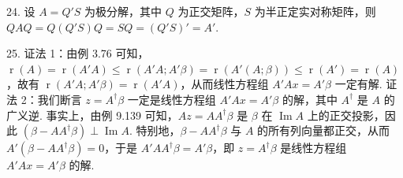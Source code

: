 \documentclass[UTF8, 12pt, fontset=fandol, oneside]{ctexart}
\begin{document}
24. 设 $A=Q'S$ 为极分解，其中 $Q$ 为正交矩阵，$S$ 为半正定实对称矩阵，则 $QAQ=Q(Q'S)Q=SQ=(Q'S)'=A'$.

25. 证法 1：由例 3.76 可知，$\operatorname{r}(A)=\operatorname{r}(A'A)\le \operatorname{r}(A'A;A'\beta)=\operatorname{r}(A'(A;\beta))\le \operatorname{r}(A')=\operatorname{r}(A)$，故有 $\operatorname{r}(A'A;A'\beta)=\operatorname{r}(A'A)$，从而线性方程组 $A'Ax=A'\beta$ 一定有解. 证法 2：我们断言 $z=A^\dagger\beta$ 一定是线性方程组 $A'Ax=A'\beta$ 的解，其中 $A^\dagger$ 是 $A$ 的广义逆. 事实上，由例 9.139 可知，$Az=AA^\dagger\beta$ 是 $\beta$ 在 $\operatorname{Im}A$ 上的正交投影，因此 $(\beta-AA^\dagger\beta)\perp\operatorname{Im}A$. 特别地，$\beta-AA^\dagger\beta$ 与 $A$ 的所有列向量都正交，从而 $A'(\beta-AA^\dagger\beta)=0$，于是 $A'AA^\dagger\beta=A'\beta$，即 $z=A^\dagger\beta$ 是线性方程组 $A'Ax=A'\beta$ 的解.
\end{document}
